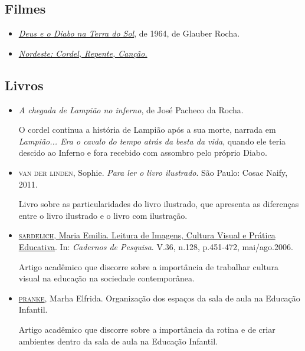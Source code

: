 \documentclass[11pt]{extarticle}
\begin{document}
\subsection{Filmes}

\begin{itemize}

	\item \href{https://www.youtube.com/watch?v=RyTnX_yl1bw}{\textit{Deus e o Diabo na Terra do Sol}}, de 1964, de Glauber Rocha. 

	\item \href{https://www.youtube.com/watch?v=xFOZxwBcUmo}{\textit{Nordeste: Cordel, Repente, Canção.}} 

\end{itemize}

\subsection{Livros}

\begin{itemize}
	\item \textit{A chegada de Lampião no inferno}, de José Pacheco da Rocha. 

O cordel continua a história de Lampião após a sua morte, narrada em \textit{Lampião... Era o cavalo do tempo atrás da besta da vida}, quando ele teria descido ao Inferno e fora recebido com assombro pelo próprio Diabo. 

	\item \textsc{van der linden}, Sophie. \textit{Para ler o livro ilustrado}. São Paulo: Cosac Naify, 2011.

Livro sobre as particularidades do livro ilustrado, que apresenta as diferenças entre o livro ilustrado e o livro com ilustração. 
\end{itemize}

\begin{itemize}
\item \href{https://www.scielo.br/pdf/cp/v36n128/v36n128a09}{\textsc{sardelich}, Maria Emilia. Leitura de Imagens, Cultura Visual e Prática Educativa}. 
In: \textit{Cadernos de Pesquisa}. V.36, n.128, p.451-472, mai/ago.2006.  


Artigo acadêmico que discorre sobre a importância de trabalhar cultura 
visual na educação na sociedade contemporânea. 

\item \href{http://centraldeinteligenciaacademica.blogspot.com/2016/04/organizacao-dos-espacos-da-sala-de-aula.html}{\textsc{pranke}}, Marha Elfrida. Organização dos espaços da sala de aula na Educação Infantil. 

Artigo acadêmico que discorre sobre a importância da rotina e de criar ambientes dentro da sala de aula na Educação Infantil.  
\end{itemize}
\end{document}
